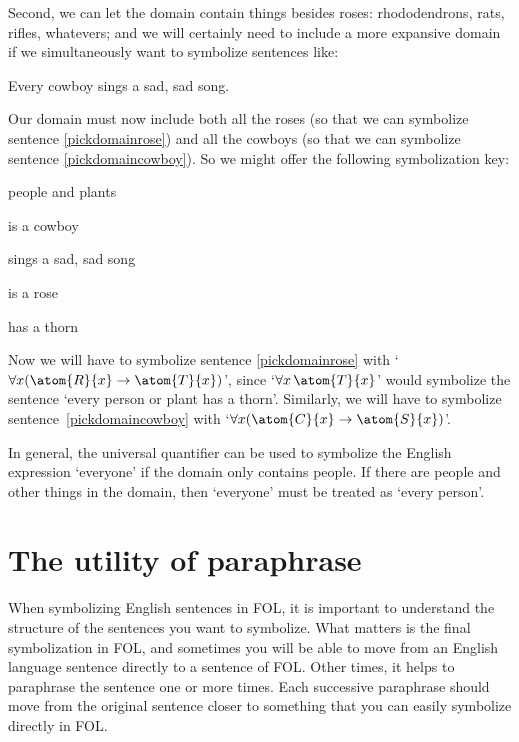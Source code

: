 Second, we can let the domain contain things besides roses: rhododendrons, rats, rifles,  whatevers; and we will certainly need to include a more expansive domain if we simultaneously want to symbolize sentences like:
	\begin{earg}
		\item[\ex{pickdomaincowboy}] Every cowboy sings a sad, sad song.
	\end{earg}
Our domain must now include both all the roses (so that we can symbolize sentence \ref{pickdomainrose}) and all the cowboys (so that we can symbolize sentence \ref{pickdomaincowboy}). So we might offer the following symbolization key:
	\begin{ekey}
		\item[\text{domain}] people and plants
		\item[\atom{C}{x}]  is a cowboy
		\item[\atom{S}{x}]  sings a sad, sad song
		\item[\atom{R}{x}]  is a rose
		\item[\atom{T}{x}]  has a thorn
	\end{ekey}
Now we will have to symbolize sentence \ref{pickdomainrose} with `$\forall x (\atom{R}{x} \eif \atom{T}{x})$', since `$\forall x\, \atom{T}{x}$' would symbolize the sentence `every person or plant has a thorn'. Similarly, we will have to symbolize sentence~\ref{pickdomaincowboy} with `$\forall x (\atom{C}{x} \eif \atom{S}{x})$'.

In general, the universal quantifier can be used to symbolize the English expression `everyone' if the domain only contains people. If there are people and other things in the domain, then `everyone' must be treated as `every person'.


\section{The utility of paraphrase}
When symbolizing English sentences in FOL, it is important to understand the structure of the sentences you want to symbolize. What matters is the final symbolization in FOL, and sometimes you will be able to move from an English language sentence directly to a sentence of FOL. Other times, it helps to paraphrase the sentence one or more times. Each successive paraphrase should move from the original sentence closer to something that you can easily symbolize directly in FOL.

